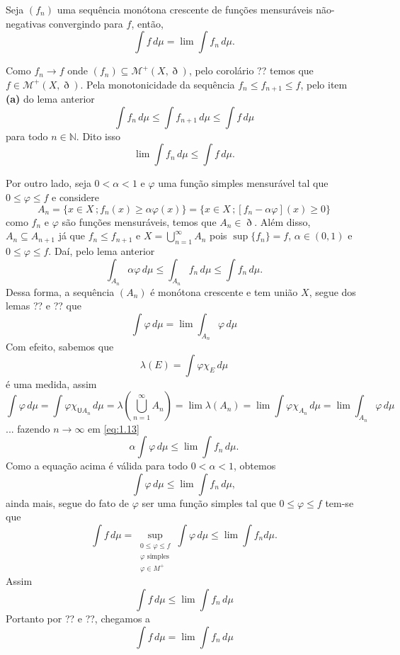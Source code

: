 \documentclass[a4paper, 11pt]{book}
\theoremstyle{definition}
\newcommand{\medcup}{\mathsf{U}}
\newcommand{\bN}{\mathbb{N}}
\newcommand{\cM}{\mathcal{M}}
\begin{document}
\begin{tbox} \label{thm:teorema-da-convergencia-monotona}
    Seja $(f_n)$ uma sequência monótona crescente de funções mensuráveis não-negativas convergindo para $f$, então,
    \[
        \int f \, d\mu = \lim \int f_n \, d \mu.
    \]
\end{tbox}
\begin{prf}
    Como $f_n \to f$ onde $(f_n) \subseteq \cM^+(X,\eth)$, pelo corolário ?? temos que $f \in \cM^+(X,\eth)$.
    Pela monotonicidade da sequência $f_n \leqslant f_{n+1} \leqslant f$, pelo item \textbf{(a)} do lema anterior
    \[
        \int f_n \, d\mu \leqslant \int f_{n+1} \, d\mu \leqslant \int f \, d\mu
    \]
    para todo $n \in \bN$. 
    Dito isso
    \[
        \lim \int f_n \, d\mu \leqslant \int f \, d\mu.
    \]

    Por outro lado, seja $0 < \alpha < 1$ e $\varphi$ uma função simples mensurável tal que $0 \leqslant \varphi \leqslant f$ e considere
    \[
        A_n = \{x \in X \,; f_n(x) \geqslant \alpha \varphi(x)\} = \{x \in X \,; [f_n - \alpha \varphi](x) \geqslant 0\}
    \]
    como $f_n$ e $\varphi$ são funções mensuráveis, temos que $A_n \in \eth$.
    Além disso, $A_n \subseteq A_{n+1}$ já que $f_n \leqslant f_{n+1}$ e $X = \bigcup_{n =1}^{\infty} A_n$ pois $\sup \{f_n\} = f$, $\alpha \in (0,1)$ e $0 \leqslant \varphi \leqslant f$.
    Daí, pelo lema anterior
    \begin{equation} \label{eq:1.13}
        \int_{A_n} \alpha \varphi \,d\mu \leqslant \int_{A_n} f_n \, d\mu \leqslant \int f_n \, d\mu.
    \end{equation}
    Dessa forma, a sequência $(A_n)$ é monótona crescente e tem união $X$, segue dos lemas ?? e ?? que
    \[
        \int \varphi \, d\mu = \lim \int_{A_n} \varphi \, d\mu
    \]
    Com efeito, sabemos que
    \[
        \lambda(E) = \int \varphi \chi_{E} \, d \mu
    \]
    é uma medida, assim
    \[
        \int \varphi \, d\mu = \int \varphi \chi_{\medcup A_n} \, d\mu = \lambda \left( \bigcup_{n=1}^\infty A_n \right) = \lim \lambda(A_n) = \lim \int \varphi \chi_{A_n} \, d\mu = \lim \int_{A_n} \varphi \, d\mu
    \]
    ... fazendo $n \to \infty$ em \ref{eq:1.13}
    \[
        \alpha \int \varphi \, d\mu \leqslant \lim \int f_n \, d\mu.
    \]
    Como a equação acima é válida para todo $0 < \alpha < 1$, obtemos
    \[
        \int \varphi \, d\mu \leqslant \lim \int f_n \, d\mu,
    \]
    ainda mais, segue do fato de $\varphi$ ser uma função simples tal que $0 \leqslant \varphi \leqslant f$ tem-se que
    \[
        \int f \, d\mu = \sup_{\substack{0 \leqslant \varphi \leqslant f \\ \varphi \text{ simples} \\ \varphi \in M^+}} \int \varphi \, d\mu \leqslant \lim \int f_n d \mu.
    \]
    Assim
    \[
        \int f \, d\mu \leqslant \lim \int f_n \, d\mu
    \]
    Portanto por ?? e ??, chegamos a
    \[
        \int f \, d\mu = \lim \int f_n \, d\mu
    \]
\end{prf}
\end{document}
